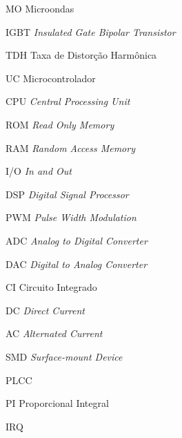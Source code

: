 
\begin{siglas}
    \item[MO] Microondas
    \item[IGBT] \textit{Insulated Gate Bipolar Transistor}
    \item[TDH] Taxa de Distorção Harmônica
    \item[UC] Microcontrolador
    \item[CPU] \textit{Central Processing Unit}
    \item[ROM] \textit{Read Only Memory}
    \item[RAM] \textit{Random Access Memory}
    \item[I/O] \textit{In and Out}
    \item[DSP] \textit{Digital Signal Processor}
    \item[PWM] \textit{Pulse Width Modulation}
    \item[ADC] \textit{Analog to Digital Converter}
    \item[DAC] \textit{Digital to Analog Converter}
    \item[CI] Circuito Integrado
    \item[DC] \textit{Direct Current}
    \item[AC] \textit{Alternated Current}
    \item[SMD] \textit{Surface-mount Device}
    \item[PLCC] 
    \item{PI} Proporcional Integral
    \item[IRQ] 
\end{siglas}

